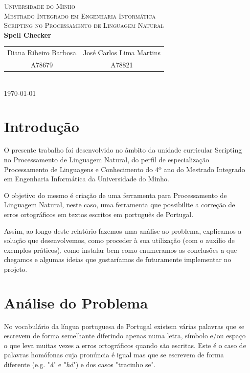 \documentclass{article}
\begin{document}
{
\center
\textsc{\Large Universidade do Minho} \\ [0.5cm]
\textsc{\Large Mestrado Integrado em Engenharia Informática} \\ [0.5cm]
\textsc{\large Scripting no Processamento de Linguagem Natural} \\ [0.5cm]

{\LARGE \bfseries Spell Checker} \\[0.2cm]

\begin{tabular}{c c}
    Diana Ribeiro Barbosa & José Carlos Lima Martins \\
    A78679 & A78821  \\
\end{tabular} \\[0.5cm]

\today \\[1cm]
}

\tableofcontents

\section{Introdução}
O presente trabalho foi desenvolvido no âmbito da unidade curricular Scripting no Processamento de Linguagem Natural, do perfil de especialização Processamento de Linguagens e Conhecimento do 4º ano do Mestrado Integrado em Engenharia Informática da Universidade do Minho.
\par O objetivo do mesmo é criação de uma ferramenta para Processamento de Linguagem Natural, neste caso, uma ferramenta que possibilite a correção de erros ortográficos em textos escritos em português de Portugal.
\par Assim, ao longo deste relatório fazemos uma análise ao problema, explicamos a solução que desenvolvemos, como proceder à sua utilização (com o auxílio de exemplos práticos), como instalar bem como enumeramos as conclusões a que chegamos e algumas ideias que gostaríamos de futuramente implementar no projeto.

\section{Análise do Problema}\label{prob}

No vocabulário da língua portuguesa de Portugal existem várias palavras que se escrevem de forma semelhante diferindo apenas numa letra, símbolo e/ou espaço o que leva muitas vezes a erros ortográficos quando são escritas. Este é o caso de palavras homófonas cuja pronúncia é igual mas que se escrevem de forma diferente (e.g. "\textit{à}" e "\textit{há}") e dos casos "tracinho se".
\end{document}

